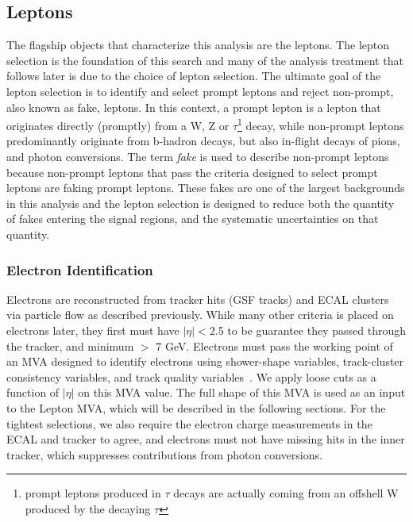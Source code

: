 \subsection{Leptons}
The flagship objects that characterize this analysis are the leptons. The lepton selection is the foundation of this \tth search and many of the analysis treatment that follows later is due to the
choice of lepton selection. The ultimate goal of the lepton selection is to identify and select prompt leptons and reject non-prompt, also known as fake, leptons. In this context, a prompt lepton
is a lepton that originates directly (promptly) from a W, Z or $\tau$\footnote{prompt leptons produced in $\tau$ decays are actually coming from an offshell W produced by the decaying $\tau$} decay, while non-prompt leptons
predominantly originate from b-hadron decays, but also in-flight decays of pions, and photon conversions. The term \emph{fake} is used to describe non-prompt leptons because non-prompt leptons
that pass the criteria designed to select prompt leptons are faking prompt leptons. These fakes are one of the largest backgrounds in this analysis and the lepton selection is designed to reduce both
the quantity of fakes entering the signal regions, and the systematic uncertainties on that quantity. 

\subsubsection{Electron Identification}
Electrons are reconstructed from tracker hits (GSF tracks) and ECAL clusters via particle flow as described previously. While many other criteria is placed on electrons later, they first must
have $|\eta|<$2.5 to be guarantee they passed through the tracker, and minimum \pt $>$ 7 GeV. Electrons must pass the working point of an MVA designed to identify electrons using shower-shape variables,
track-cluster consistency variables, and track quality variables~\cite{elemvaid}. We apply loose cuts as a function of $|\eta|$ on this MVA value. The full shape of this MVA is used as an input to
the Lepton MVA, which will be described in the following sections. For the tightest selections, we also require the electron charge measurements in the ECAL and tracker to agree, and electrons must not have
missing hits in the inner tracker, which suppresses contributions from photon conversions. 


